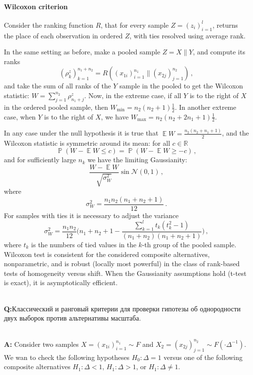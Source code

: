 \documentclass[a4paper,14pt]{extarticle}
\newcommand{\Ncal}{\mathcal{N}}
\newcommand{\ex}{\mathop{\mathbb{E}}\nolimits}
\newcommand{\pr}{\mathop{\mathbb{P}}\nolimits}
\newcommand{\rus}[1]{\foreignlanguage{russian}{#1}}
\begin{document}
\paragraph{Wilcoxon criterion} %
\label{par:wilcoxon_criterion}
Consider the ranking function $R$, that for every sample $Z=(z_i)_{i=1}^l$, returns
the place of each observation in ordered $Z$, with ties resolved using average rank.

In the same setting as before, make a pooled sample $Z = X \| Y$, and compute its
ranks
$$ (\rho^z_k)_{k=1}^{n_1+n_2} = R((x_{1i})_{i=1}^{n_1}\|(x_{2j})_{j=1}^{n_2}) \,, $$
and take the sum of all ranks of the $Y$ sample in the pooled to get the Wilcoxon
statistic: $ W = \sum_{j=1}^{n_2} \rho^z_{n_1+j} $. Now, in the extreme case, if
all $Y$ is to the right of $X$ in the ordered pooled sample, then $W_{\text{min}}
= n_2 (n_2+1)\frac{1}{2}$. In another extreme case, when $Y$ is to the right of $X$,
we have $W_{\text{max}} = n_2(n_2 + 2n_1 + 1) \frac{1}{2}$.

In any case under the null hypothesis it is true that $ \ex W = \frac{n_2 (n_2 + n_1 + 1)}{2}$,
and the Wilcoxon statistic is symmetric around its mean: for all $c\in \mathbb{R}$
$$ \pr(W - \ex W \leq c) = \pr(W - \ex W \geq -c) \,, $$
and for sufficiently large $n_k$ we have the limiting Gaussianity:
$$ \frac{W - \ex W}{\sqrt{\sigma^2_W}} \sin \Ncal(0, 1) \,, $$
where 
$$ \sigma^2_W = \frac{n_1 n_2 (n_1+n_2+1)}{12} \,. $$
For samples with ties it is necessary to adjust the variance
$$ \sigma^2_W
    = \frac{n_1 n_2}{12} \biggl(n_1+n_2+1
        -\frac{\sum_{k=1}^l t_k(t_k^2-1)}{(n_1+n_2)(n_1+n_2+1)}
    \biggr) \,, $$
where $t_k$ is the numbers of tied values in the $k$-th group of the pooled sample.
Wilcoxon test is consistent for the considered composite alternatives, nonparametric,
and is robust (locally most powerful) in the class of rank-based tests of homogeneity
versus shift. When the Gaussianity assumptions hold (t-test is exact), it is asymptotically
efficient.


\hfill\\\noindent\textbf{Q:}\rus{Классический и ранговый критерии для проверки гипотезы
об однородности двух выборок против альтернативы масштаба.}

\hfill\\\noindent\textbf{A:}
Consider two samples $X=(x_{1i})_{i=1}^{n_1}\sim F$ and $X_2=(x_{2j})_{j=1}^{n_2}
\sim F(\cdot\Delta^{-1})$. We wan to check the following hypotheses $H_0: \Delta=1$
versus one of the following composite alternatives $H_1: \Delta < 1$, $H_1: \Delta > 1$,
or $H_1: \Delta \neq 1$.
\end{document}
